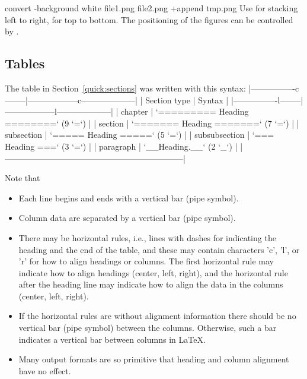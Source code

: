\documentclass[twoside]{book}
\begin{document}
{convert -background white file1.png file2.png +append tmp.png
\esys
Use  for stacking left to right,  for top to bottom.
The positioning of the figures can be controlled by .

\subsection{Tables}

The table in Section~\ref{quick:sections} was written with this
syntax:
\bccq
|----------------c--------|------------------c--------------------|
|      Section type       |        Syntax                         |
|----------------l--------|------------------l--------------------|
| chapter                 | `========= Heading ========` (9 `=`)  |
| section                 | `======= Heading =======`    (7 `=`)  |
| subsection              | `===== Heading =====`        (5 `=`)  |
| subsubsection           | `=== Heading ===`            (3 `=`)  |
| paragraph               | `__Heading.__`               (2 `_`)  |
|-----------------------------------------------------------------|
\eccq

Note that

\begin{itemize}
 \item Each line begins and ends with a vertical bar (pipe symbol).

 \item Column data are separated by a vertical bar (pipe symbol).

 \item There may be horizontal rules, i.e., lines with dashes for
   indicating the heading and the end of the table, and these may
   contain characters 'c', 'l', or 'r' for how to align headings or
   columns. The first horizontal rule may indicate how to align
   headings (center, left, right), and the horizontal rule after the
   heading line may indicate how to align the data in the columns
   (center, left, right).

 \item If the horizontal rules are without alignment information there should
   be no vertical bar (pipe symbol) between the columns. Otherwise, such
   a bar indicates a vertical bar between columns in {\LaTeX}.

 \item Many output formats are so primitive that heading and column alignment
   have no effect.
\end{itemize}

}
\end{document}
